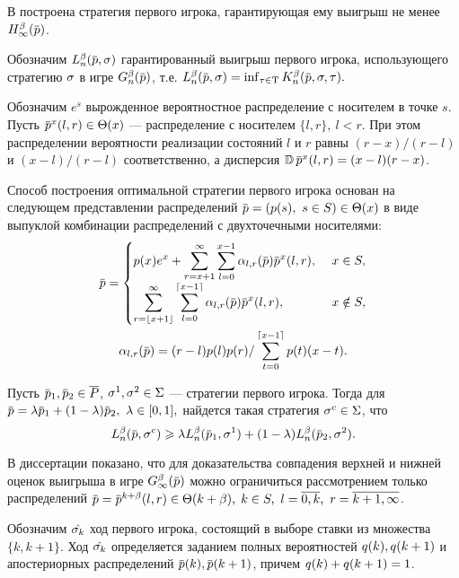 В  построена стратегия первого игрока, гарантирующая ему выигрыш не менее $\H{\infty}(\p)$.

Обозначим $\L{n}(\p, \sigmar)$ гарантированный выигрыш первого игрока, использующего стратегию $\sigma$ в игре $\theG{n}(\p)$, т.е.
$
  \L{n}(\p, \sigmar) = \inf_{\taur \in \Tau} \K{n}(\p, \sigmar, \taur).
$

Обозначим $e^s$ вырожденное вероятностное распределение с носителем в точке $s$.
Пусть $\pd^x(l, r) \in \Theta(x)$ --- распределение с носителем $\{l, r\},\ l<r$.
При этом распределении вероятности реализации состояний $l$ и $r$ равны $(r-x)/(r-l)$ и $(x-l)/(r-l)$ соответственно, а дисперсия
$\D \pd^x(l, r) = (x - l)(r - x)$.

Способ построения оптимальной стратегии первого игрока основан на следующем представлении распределений $\pd = (\pc{s},\ s \in S) \in \Theta(x)$ в виде выпуклой комбинации распределений с двухточечными носителями:
\begin{gather}
  \label{ch2:lower-bound:eq:prob-decomp-sum}
  \pd = \begin{cases}
    \displaystyle
    \pc{x} e^x + \sum_{r=x+1}^\infty \sum_{l=0}^{x-1} \alpha_{l,r}(\pd) \pd^x(l, r),\ & x \in S,\\
    \displaystyle
    \sum_{r=\floor{x+1}}^\infty \sum_{l=0}^{\ceil{x-1}} \alpha_{l,r}(\pd) \pd^x(l, r),\ & x \notin S,\\
  \end{cases}\\
  \alpha_{l,r}(\pd) = (r-l) \pc{l} \pc{r} / \sum_{t=0}^{\ceil{x-1}} \pc{t} (x-t). \nonumber
\end{gather}
\begin{lemma}
  \label{ch2:lower-bound:lemma:convex-combination}
  Пусть $\pd_1, \pd_2 \in \MM$, $\sigma^1, \sigma^2 \in \Sigma$ --- стратегии первого игрока.
  Тогда для $\pd = \lambda \pd_1 + (1-\lambda) \pd_2,\ \lambda \in [0, 1],$ найдется такая стратегия $\sigma^c \in \Sigma$, что
  \[
    \L{n}(\pd, \sigmar^c) \geqslant
    \lambda \L{n}(\pd_1, \sigmar^1) + (1-\lambda) \L{n}(\pd_2, \sigmar^2).
  \]
\end{lemma}

В диссертации показано, что для доказательства совпадения верхней и нижней оценок выигрыша в игре $\theG{\infty}(\pd)$ можно ограничиться рассмотрением только распределений %
$\pd = \pd^{k+\beta}(l, r) \in \Theta(k + \beta), \; k \in S,\ l = \overline{0, k},\ r = \overline{k+1, \infty}$.

Обозначим $\hat{\sigma_k}$ ход первого игрока, состоящий в выборе ставки из множества $\{k, k+1\}$.
Ход $\hat{\sigma_k}$ определяется заданием полных вероятностей $q(k), q(k+1)$ и апостериорных распределений $\pad{k}, \pad{k+1}$, причем $q(k) + q(k+1) = 1$.

